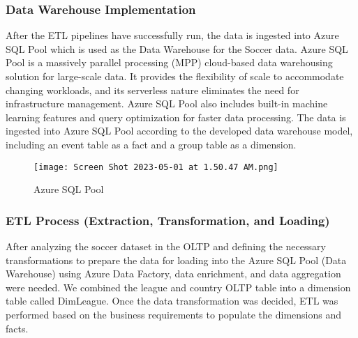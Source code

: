 \documentclass[lettersize]{IEEEtran}
\begin{document}
\subsubsection{\textbf{Data Warehouse Implementation}}
After the ETL pipelines have successfully run, the data is ingested into Azure SQL Pool which is used as the Data Warehouse for the Soccer data. Azure SQL Pool is a massively parallel processing (MPP) cloud-based data warehousing solution for large-scale data. It provides the flexibility of scale to accommodate changing workloads, and its serverless nature eliminates the need for infrastructure management. Azure SQL Pool also includes built-in machine learning features and query optimization for faster data processing. The data is ingested into Azure SQL Pool according to the developed data warehouse model, including an event table as a fact and a group table as a dimension.
\begin{figure}[H]
    \centering
    \texttt{[image: Screen Shot 2023-05-01 at 1.50.47 AM.png]}
    \caption{Azure SQL Pool}
    \label{fig:image_label}
\end{figure}

\subsubsection{\textbf{ETL Process (Extraction, Transformation, and Loading)}}
After analyzing the soccer dataset in the OLTP and defining the necessary transformations to prepare the data for loading into the Azure SQL Pool (Data Warehouse) using Azure Data Factory, data enrichment, and data aggregation were needed. We combined the league and country OLTP table into a dimension table called DimLeague. Once the data transformation was decided, ETL was performed based on the business requirements to populate the dimensions and facts.\
\end{document}
